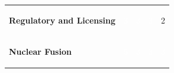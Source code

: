 \documentclass[10pt,a4paper]{article}
\begin{document}
{\begin{tabular}{p{38mm}>{\centering\arraybackslash}p{21mm}>{\centering\arraybackslash}p{21mm}>{\centering\arraybackslash}p{21mm}>{\centering\arraybackslash}p{21mm}}
{\bfseries Regulatory and Licensing} & \colorbox{BOBlue}{\textcolor{white}{\strut\hspace{5pt}3\hspace{5pt}}} & \colorbox{BOBlue}{\textcolor{white}{\strut\hspace{5pt}3\hspace{5pt}}} & \colorbox{BOBlue}{\textcolor{white}{\strut\hspace{5pt}3\hspace{5pt}}} & \colorbox{BOLight}{\textcolor{BOText}{\strut\hspace{5pt}2\hspace{5pt}}} \\
{\bfseries Nuclear Fusion} & \colorbox{BOGreen}{\textcolor{white}{\strut\hspace{5pt}5\hspace{5pt}}} & \colorbox{BOBlue}{\textcolor{white}{\strut\hspace{5pt}3\hspace{5pt}}} & \colorbox{BOBlue}{\textcolor{white}{\strut\hspace{5pt}3\hspace{5pt}}} & \colorbox{BOBlue}{\textcolor{white}{\strut\hspace{5pt}3\hspace{5pt}}} \\
\end{tabular}}\par\vspace{2pt}
\end{document}
